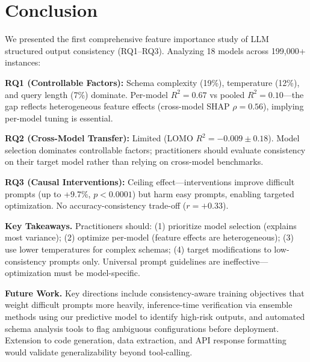 \documentclass[sigconf,anonymous,review]{acmart}
\begin{document}
\section{Conclusion}
\label{sec:conclusion}

We presented the first comprehensive feature importance study of LLM structured output consistency (RQ1--RQ3). Analyzing 18 models across 199,000+ instances:

\textbf{RQ1 (Controllable Factors):} Schema complexity (19\%), temperature (12\%), and query length (7\%) dominate. Per-model $R^2=0.67$ vs pooled $R^2=0.10$---the gap reflects heterogeneous feature effects (cross-model SHAP $\rho=0.56$), implying per-model tuning is essential.

\textbf{RQ2 (Cross-Model Transfer):} Limited (LOMO $R^2=-0.009 \pm 0.18$). Model selection dominates controllable factors; practitioners should evaluate consistency on their target model rather than relying on cross-model benchmarks.

\textbf{RQ3 (Causal Interventions):} Ceiling effect---interventions improve difficult prompts (up to +9.7\%, $p<0.0001$) but harm easy prompts, enabling targeted optimization. No accuracy-consistency trade-off ($r=+0.33$).

\textbf{Key Takeaways.} Practitioners should: (1) prioritize model selection (explains most variance); (2) optimize per-model (feature effects are heterogeneous); (3) use lower temperatures for complex schemas; (4) target modifications to low-consistency prompts only. Universal prompt guidelines are ineffective---optimization must be model-specific.

\textbf{Future Work.} Key directions include consistency-aware training objectives that weight difficult prompts more heavily, inference-time verification via ensemble methods using our predictive model to identify high-risk outputs, and automated schema analysis tools to flag ambiguous configurations before deployment. Extension to code generation, data extraction, and API response formatting would validate generalizability beyond tool-calling.

\end{document}
